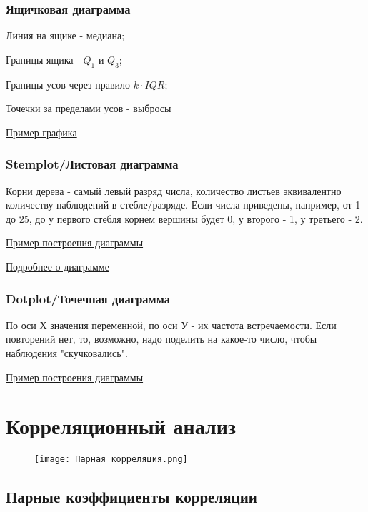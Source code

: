 \documentclass[a4paper,12pt]{article} %
\begin{document}
\subsubsection{Ящичковая диаграмма}
Линия на ящике - медиана;

Границы ящика - $Q_1$ и $Q_3$;

Границы усов через правило $k\cdot IQR$;

Точечки за пределами усов - выбросы

\href{https://3.bp.blogspot.com/-sqSGopnp0lo/Uvu_wl_dPQI/AAAAAAAAAgs/F2DBOSdfiU4/s1600/boxplot.PNG}{Пример графика}

\subsubsection{Stemplot/Листовая диаграмма}
Корни дерева - самый левый разряд числа, количество листьев эквивалентно количеству наблюдений в стебле/разряде. Если числа приведены, например, от 1 до 25, до у первого стебля корнем вершины будет 0, у второго - 1, у третьего - 2.

\href{https://i.stack.imgur.com/UGlpf.png}{Пример построения диаграммы}

\href{https://ru.wikipedia.org/wiki/Диаграмма_стебель-листья}{Подробнее о диаграмме}

\subsubsection{Dotplot/Точечная диаграмма}
По оси Х значения переменной, по оси У - их частота встречаемости. Если повторений нет, то, возможно, надо поделить на какое-то число, чтобы наблюдения "скучковались".

\href{https://sun9-32.userapi.com/impg/FsdsXE5cQD1Uj3tscNEvt5yO3F7SLQF9_Ae7jA/B9fgtVsEuHs.jpg?size=456x352&quality=96&proxy=1&sign=ff92dd074fa03764f981eff9c002c696&type=album}{Пример построения диаграммы}

\section{Корреляционный анализ}

\begin{figure}[htp]
    \centering
    \texttt{[image: Парная корреляция.png]}
\end{figure}

\subsection{Парные коэффициенты корреляции}
\end{document}
